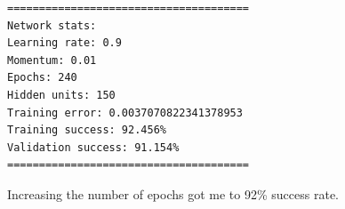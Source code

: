 \documentclass[11pt]{article}
\begin{document}
\begin{verbatim}
======================================
Network stats: 
Learning rate: 0.9
Momentum: 0.01
Epochs: 240
Hidden units: 150
Training error: 0.0037070822341378953
Training success: 92.456%
Validation success: 91.154%
======================================
\end{verbatim}

Increasing the number of epochs got me to 92\% success rate.


    
    
    
    
\end{document}

